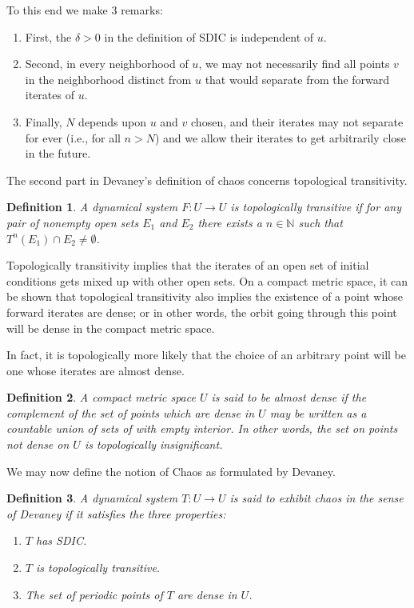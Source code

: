 \documentclass[12 pt]{article}
\newtheorem{Definition}{Definition}[]
\begin{document}
To this end we make 3 remarks:
\vspace{-5mm}
\begin{enumerate}
  \item First, the $\delta>0$ in the definition of SDIC is independent of $u$. 
  \item Second, in every neighborhood of $u$, we may not necessarily find all points $v$ in the neighborhood distinct from $u$ that would separate from the forward iterates of $u$. 
  \item  Finally, $N$ depends upon $u$ and $v$ chosen, and their iterates may not separate for ever (i.e., for all $n>N$) and we allow their iterates to get arbitrarily close in the future. 
\end{enumerate}


 

The second part in Devaney's definition of chaos concerns topological transitivity.

\begin{Definition}
	A dynamical system $F: U \to U$ is topologically transitive if for any pair of nonempty open sets $E_1$ and $E_2$ there exists a $n\in\mathbb{N}$ such that $T^n(E_1) \cap E_2 \not= \emptyset$. 
\end{Definition}

Topologically transitivity implies that the iterates of an open set of initial conditions gets mixed up with other open sets. On a compact metric space, it can be shown that topological transitivity also implies the existence of a point whose forward iterates are dense; or in other words, the orbit going through this point will be dense in the compact metric space. 

In fact, it is topologically more likely that the choice of an arbitrary point will be one  whose iterates are almost dense.
\begin{Definition}
A compact metric space $U$ is said to be almost dense if the complement of the set of points which are dense in $U$ may be written as a countable union of sets of with empty interior. In other words, the set on points not dense on $U$ is topologically insignificant.
\end{Definition}

We may now define the notion of Chaos as formulated by Devaney\cite{devaney2018introduction}.
\begin{Definition}
	A dynamical system $T: U \to U$ is said to exhibit chaos in the sense of Devaney if it satisfies the three properties:
	\vspace{-5mm}
  \begin{enumerate}
		\item $T$ has SDIC.
		\item $T$ is topologically transitive.
		\item The set of periodic points of $T$ are dense in $U$. 
	\end{enumerate}
\end{Definition}
\end{document}
